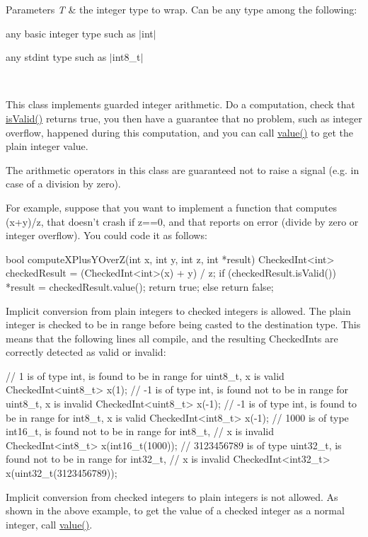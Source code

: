 \begin{DoxyParams}{Parameters}
{\em T} & the integer type to wrap. Can be any type among the following\-:
\begin{DoxyItemize}
\item any basic integer type such as $|$int$|$
\item any stdint type such as $|$int8\-\_\-t$|$
\end{DoxyItemize}\\
\hline
\end{DoxyParams}
This class implements guarded integer arithmetic. Do a computation, check that \hyperlink{classmozilla_1_1_checked_int_aa875473e559646998e2cb4f0f54aedc3}{is\-Valid()} returns true, you then have a guarantee that no problem, such as integer overflow, happened during this computation, and you can call \hyperlink{classmozilla_1_1_checked_int_a8b36b4a1c385abb43884bcb430fef088}{value()} to get the plain integer value.

The arithmetic operators in this class are guaranteed not to raise a signal (e.\-g. in case of a division by zero).

For example, suppose that you want to implement a function that computes (x+y)/z, that doesn't crash if z==0, and that reports on error (divide by zero or integer overflow). You could code it as follows\-: 
\begin{DoxyCode}
   bool computeXPlusYOverZ(int x, int y, int z, int *result)
   {
       CheckedInt<int> checkedResult = (CheckedInt<int>(x) + y) / z;
       if (checkedResult.isValid()) {
           *result = checkedResult.value();
           return true;
       } else {
           return false;
       }
   }
\end{DoxyCode}


Implicit conversion from plain integers to checked integers is allowed. The plain integer is checked to be in range before being casted to the destination type. This means that the following lines all compile, and the resulting Checked\-Ints are correctly detected as valid or invalid\-: 
\begin{DoxyCode}
   // 1 is of type int, is found to be in range for uint8_t, x is valid
   CheckedInt<uint8_t> x(1);
   // -1 is of type int, is found not to be in range for uint8_t, x is invalid
   CheckedInt<uint8_t> x(-1);
   // -1 is of type int, is found to be in range for int8_t, x is valid
   CheckedInt<int8_t> x(-1);
   // 1000 is of type int16_t, is found not to be in range for int8_t,
   // x is invalid
   CheckedInt<int8_t> x(int16_t(1000)); 
   // 3123456789 is of type uint32_t, is found not to be in range for int32_t,
   // x is invalid
   CheckedInt<int32_t> x(uint32_t(3123456789));
\end{DoxyCode}
 Implicit conversion from checked integers to plain integers is not allowed. As shown in the above example, to get the value of a checked integer as a normal integer, call \hyperlink{classmozilla_1_1_checked_int_a8b36b4a1c385abb43884bcb430fef088}{value()}.

